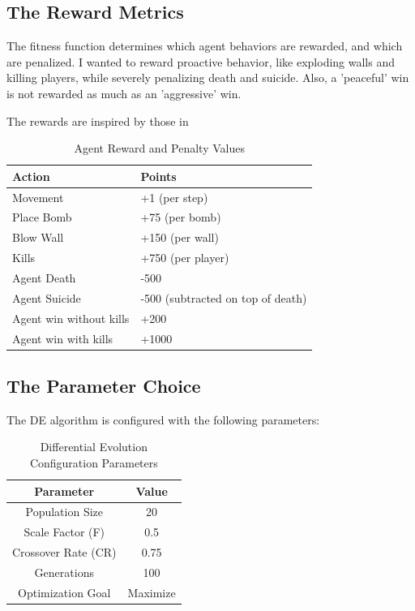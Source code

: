 \documentclass[sigconf]{acmart} %
\begin{document}
\subsection{The Reward Metrics}
The fitness function determines which agent behaviors are rewarded, and which are penalized. I wanted to reward proactive behavior, like exploding walls and killing players, while severely penalizing death and suicide. Also, a 'peaceful' win is not rewarded as much as an 'aggressive' win.

The rewards are inspired by those in \cite{essay107351}
\begin{table}[H]
\centering

\caption{\label{tab:reward_values}Agent Reward and Penalty Values}

\begin{tabular}{l|l}
\textbf{Action} & \textbf{Points}  \\
\hline
Movement & +1 (per step) \\
\hline
Place Bomb & +75 (per bomb) \\
\hline
Blow Wall & +150 (per wall) \\
\hline
Kills & +750 (per player) \\
\hline
Agent Death  & -500  \\
\hline
Agent Suicide & -500 (subtracted on top of death) \\
\hline
Agent win without kills & +200  \\
\hline
Agent win with kills & +1000  \\
\hline
\end{tabular}
\end{table}

\subsection{The Parameter Choice}

The DE algorithm is configured with the following parameters:

\begin{table}[htbp]
\centering
\caption{Differential Evolution Configuration Parameters}
\begin{tabular}{c|c}
\hline
\textbf{Parameter} & \textbf{Value} \\
\hline
Population Size & 20 \\
\hline
Scale Factor (F) & 0.5 \\
\hline
Crossover Rate (CR) & 0.75 \\
\hline
Generations & 100 \\
\hline
Optimization Goal & Maximize \\
\hline
\end{tabular}
\end{table}
\end{document}
